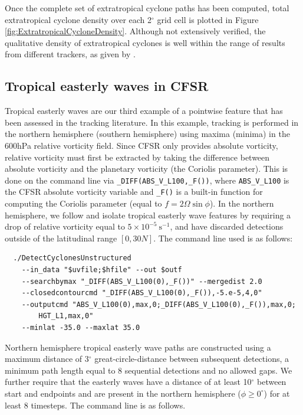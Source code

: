 \documentclass[gmdd, hvmath, online]{copernicus_discussions}
\begin{document}
Once the complete set of extratropical cyclone paths has been computed, total extratropical cyclone density over each 2$^\circ$ grid cell is plotted in Figure \ref{fig:ExtratropicalCycloneDensity}.  Although not extensively verified, the qualitative density of extratropical cyclones is well within the range of results from different trackers, as given by \cite{neu2013imilast}.

\subsection{Tropical easterly waves in CFSR} \label{sec:TropicalEasterlyWavesExample}

Tropical easterly waves are our third example of a pointwise feature that has been assessed in the tracking literature.  In this example, tracking is performed in the northern hemisphere (southern hemisphere) using maxima (minima) in the 600hPa relative vorticity field.  Since CFSR only provides absolute vorticity, relative vorticity must first be extracted by taking the difference between absolute vorticity and the planetary vorticity (the Coriolis parameter).  This is done on the command line via \texttt{\_DIFF(ABS\_V\_L100,\_F())}, where \texttt{ABS\_V\_L100} is the CFSR absolute vorticity variable and \texttt{\_F()} is a built-in function for computing the Coriolis parameter (equal to $f = 2 \Omega \sin \phi$).  In the northern hemisphere, we follow \cite{thorncroft2001african} and isolate tropical easterly wave features by requiring a drop of relative vorticity equal to $5 \times 10^{-5}\ \mbox{s}^{-1}$, and have discarded detections outside of the latitudinal range $[0, 30N]$.  The command line used is as follows:

{\small \begin{verbatim}
  ./DetectCyclonesUnstructured
    --in_data "$uvfile;$hfile" --out $outf
    --searchbymax "_DIFF(ABS_V_L100(0),_F())" --mergedist 2.0
    --closedcontourcmd "_DIFF(ABS_V_L100(0),_F()),-5.e-5,4,0"
    --outputcmd "ABS_V_L100(0),max,0;_DIFF(ABS_V_L100(0),_F()),max,0;
        HGT_L1,max,0"
    --minlat -35.0 --maxlat 35.0 
\end{verbatim}}

Northern hemisphere tropical easterly wave paths are constructed using a maximum distance of 3$^\circ$ great-circle-distance between subsequent detections, a minimum path length equal to 8 sequential detections and no allowed gaps.  We further require that the easterly waves have a distance of at least 10$^\circ$ between start and endpoints and are present in the northern hemisphere ($\phi \geq 0^\circ$) for at least 8 timesteps.  The command line is as follows.
\end{document}
